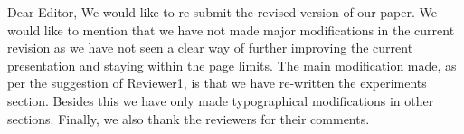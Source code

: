 Dear Editor,
We would like to re-submit the revised version of our paper. We would like to mention that we have not made major modifications in the current revision as we have not seen a clear way of further improving the current presentation and staying within the page limits. The main modification made, as per the suggestion of Reviewer1, is that we have re-written the experiments section. Besides this we have only made typographical modifications in other sections. Finally, we also thank the reviewers for their comments.
